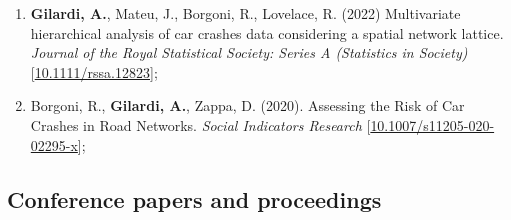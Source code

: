 \documentclass[11pt,a4paper,sans]{moderncv}
\begin{document}
\begin{enumerate}
  	\item \textbf{Gilardi, A.}, Mateu, J., Borgoni, R., Lovelace, R. (2022) Multivariate hierarchical analysis of car crashes data considering a spatial network lattice. \textit{Journal of the Royal Statistical Society: Series A (Statistics in Society)} [\href{http://doi.org/10.1111/rssa.12823}{10.1111/rssa.12823}];
  	\item Borgoni, R., \textbf{Gilardi, A.}, Zappa, D. (2020). Assessing the Risk of Car Crashes in Road Networks. \emph{Social Indicators Research} [\href{https://doi.org/10.1007/s11205-020-02295-x}{10.1007/s11205-020-02295-x}];
  \end{enumerate}
  
  \subsection{Conference papers and proceedings}
\end{document}
